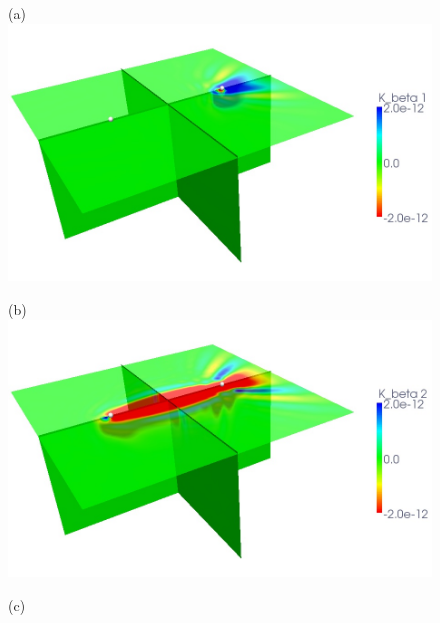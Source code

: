 \documentclass[referee,extra]{gji}
\begin{document}
\begin{figure}
\begin{center}
\begin{minipage}[t]{0.49\textwidth}
\begin{center}
(a)\\
\includegraphics[width=1.\textwidth]{./images/noise_beta_1st.jpg}\\
\end{center}
\end{minipage}
\begin{minipage}[t]{0.49\textwidth}
\begin{center}
(b)\\
\includegraphics[width=1.\textwidth]{./images/noise_beta_2nd.jpg}\\
\end{center}
\end{minipage}
\begin{minipage}[t]{0.49\textwidth}
\begin{center}
(c)\\

\end{center}
\end{minipage}
\end{center}
\end{figure}
\end{document}
